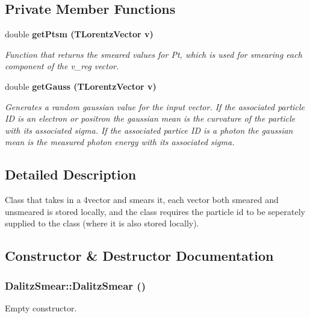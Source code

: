 \subsection*{Private Member Functions}
\begin{CompactItemize}
\item 
double \bf{get\-Ptsm} (TLorentz\-Vector v)
\begin{CompactList}\small\item\em Function that returns the smeared values for Pt, which is used for smearing each component of the v\_\-reg vector. \item\end{CompactList}\item 
double \bf{get\-Gauss} (TLorentz\-Vector v)
\begin{CompactList}\small\item\em Generates a random gaussian value for the input vector. If the associated particle ID is an electron or positron the gaussian mean is the curvature of the particle with its associated sigma. If the associated partice ID is a photon the gaussian mean is the measured photon energy with its associated sigma. \item\end{CompactList}\end{CompactItemize}


\subsection{Detailed Description}
Class that takes in a 4vector and smears it, each vector both smeared and unsmeared is stored locally, and the class requires the particle id to be seperately supplied to the class (where it is also stored locally). 



\subsection{Constructor \& Destructor Documentation}
\subsubsection{\setlength{\rightskip}{0pt plus 5cm}Dalitz\-Smear::Dalitz\-Smear ()}\label{classDalitzSmear_ee03f5d7721abecd419ec687c392a080}


Empty constructor. 

